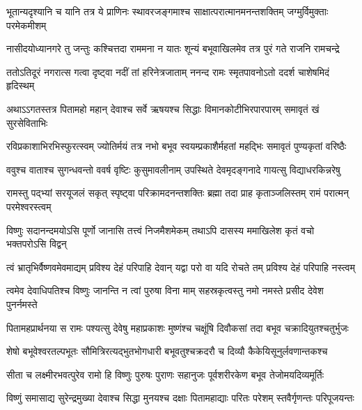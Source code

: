 \fourlineindentedshloka
{भूतान्यदृश्यानि च यानि तत्र}
{ये प्राणिनः स्थावरजङ्गमाश्च}
{साक्षात्परात्मानमनन्तशक्तिम्}
{जग्मुर्विमुक्ताः परमेकमीशम्} %

\fourlineindentedshloka
{नासीदयोध्यानगरे तु जन्तुः}
{कश्चित्तदा राममना न यातः}
{शून्यं बभूवाखिलमेव तत्र}
{पुरं गते राजनि रामचन्द्रे} %

\fourlineindentedshloka
{ततोऽतिदूरं नगरात्स गत्वा}
{दृष्ट्वा नदीं तां हरिनेत्रजाताम्}
{ननन्द रामः स्मृतपावनोऽतो}
{ददर्श चाशेषमिदं हृदिस्थम्} %

\fourlineindentedshloka
{अथाऽऽगतस्तत्र पितामहो महान्}
{देवाश्च सर्वे ऋषयश्च सिद्धाः}
{विमानकोटीभिरपारपारम्}
{समावृतं खं सुरसेविताभिः} %

\fourlineindentedshloka
{रविप्रकाशाभिरभिस्फुरत्स्वम्}
{ज्योतिर्मयं तत्र नभो बभूव}
{स्वयम्प्रकाशैर्महतां महद्भिः}
{समावृतं पुण्यकृतां वरिष्ठैः} %

\fourlineindentedshloka
{ववुश्च वाताश्च सुगन्धवन्तो}
{ववर्ष वृष्टिः कुसुमावलीनाम्}
{उपस्थिते देवमृदङ्गनादे}
{गायत्सु विद्याधरकिन्नरेषु} %

\fourlineindentedshloka
{रामस्तु पद्भ्यां सरयूजलं सकृत्}
{स्पृष्ट्वा परिक्रामदनन्तशक्तिः}
{ब्रह्मा तदा प्राह कृताञ्जलिस्तम्}
{रामं परात्मन् परमेश्वरस्त्वम्} %

\fourlineindentedshloka
{विष्णुः सदानन्दमयोऽसि पूर्णो}
{जानासि तत्त्वं निजमैशमेकम्}
{तथाऽपि दासस्य ममाखिलेश}
{कृतं वचो भक्तपरोऽसि विद्वन्} %

\fourlineindentedshloka
{त्वं भ्रातृभिर्वैष्णवमेवमाद्यम्}
{प्रविश्य देहं परिपाहि देवान्}
{यद्वा परो वा यदि रोचते तम्}
{प्रविश्य देहं परिपाहि नस्त्वम्} %

\fourlineindentedshloka
{त्वमेव देवाधिपतिश्च विष्णुः}
{जानन्ति न त्वां पुरुषा विना माम्}
{सहस्रकृत्वस्तु नमो नमस्ते}
{प्रसीद देवेश पुनर्नमस्ते} %

\fourlineindentedshloka
{पितामहप्रार्थनया स रामः}
{पश्यत्सु देवेषु महाप्रकाशः}
{मुष्णंश्च चक्षूंषि दिवौकसां तदा}
{बभूव चक्रादियुतश्चतुर्भुजः} %

\fourlineindentedshloka
{शेषो बभूवेश्वरतल्पभूतः}
{सौमित्रिरत्यद्भुतभोगधारी}
{बभूवतुश्चक्रदरौ च दिव्यौ}
{कैकेयिसूनुर्लवणान्तकश्च} %

\fourlineindentedshloka
{सीता च लक्ष्मीरभवत्पुरेव}
{रामो हि विष्णुः पुरुषः पुराणः}
{सहानुजः पूर्वशरीरकेण}
{बभूव तेजोमयदिव्यमूर्तिः} %

\fourlineindentedshloka
{विष्णुं समासाद्य सुरेन्द्रमुख्या}
{देवाश्च सिद्धा मुनयश्च दक्षाः}
{पितामहाद्याः परितः परेशम्}
{स्तवैर्गृणन्तः परिपूजयन्तः} %

